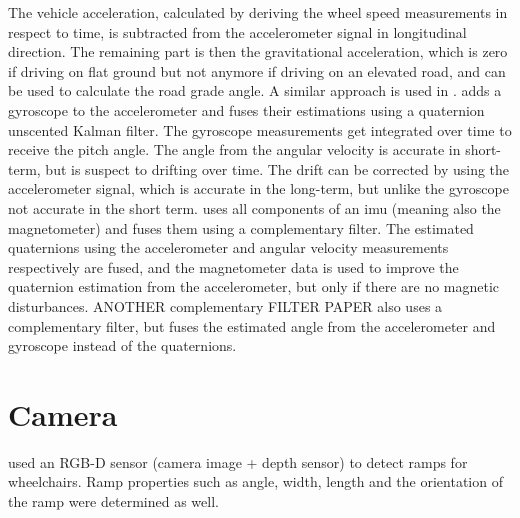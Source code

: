 The vehicle acceleration, calculated by deriving the wheel speed measurements in respect to time, is subtracted from the accelerometer signal in longitudinal direction.
The remaining part is then the gravitational acceleration, which is zero if driving on flat ground but not anymore if driving on an elevated road, and can be used to calculate the road grade angle.
A similar approach is used in \cite{Sentouh2008}.
\cite{He2020} adds a gyroscope to the accelerometer and fuses their estimations using a quaternion unscented Kalman filter.
The gyroscope measurements get integrated over time to receive the pitch angle.
The angle from the angular velocity is accurate in short-term, but is suspect to drifting over time.
The drift can be corrected by using the accelerometer signal, which is accurate in the long-term, but unlike the gyroscope not accurate in the short term.
\cite{Wu2016} uses all components of an \gls{imu} (meaning also the magnetometer) and fuses them using a complementary filter.
The estimated quaternions using the accelerometer and angular velocity measurements respectively are fused, and the magnetometer data is used to improve the quaternion estimation from the accelerometer, but only if there are no magnetic disturbances.
ANOTHER complementary FILTER PAPER also uses a complementary filter, but fuses the estimated angle from the accelerometer and gyroscope instead of the quaternions.



\section{}



\section{Camera}
\cite{Nejati2016} used an RGB-D sensor (camera image + depth sensor) to detect ramps for wheelchairs.
Ramp properties such as angle, width, length and the orientation of the ramp were determined as well.



